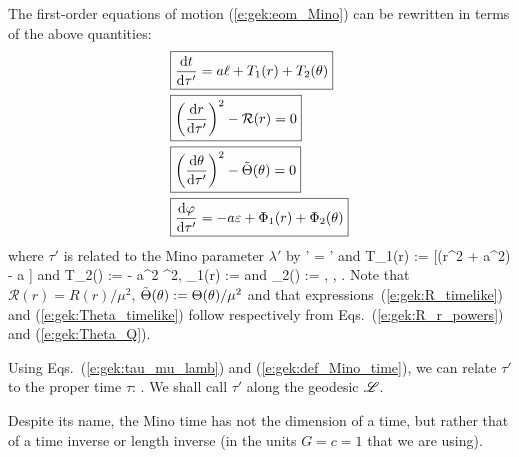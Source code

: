 The first-order equations of motion (\ref{e:gek:eom_Mino}) can be rewritten in terms of the above quantities:
\begin{subequations}
\label{e:gek:timelike_system}
\begin{align}
& \fbox{$\displaystyle  \frac{\mathrm{d} t}{\mathrm{d} \tau'} = a\ell + T_1(r) + T_2(\theta) $} \label{e:gek:dtdmino_timelike}\\
& \fbox{$\displaystyle   \left( \frac{\mathrm{d} r}{\mathrm{d} \tau'} \right)^2 - \mathcal{R}(r) = 0 $} \label{e:gek:r_eff_pot_timelike}\\
& \fbox{$\displaystyle  \left( \frac{\mathrm{d} \theta}{\mathrm{d} \tau'} \right)^2 - \tilde{\Theta}(\theta) = 0 $} \label{e:gek:th_eff_pot_timelike}\\
& \fbox{$\displaystyle  \frac{\mathrm{d} \varphi}{\mathrm{d} \tau'}  = - a \varepsilon + \Phi_1(r) + \Phi_2(\theta) $} \label{e:gek:dphdmino_timelike}
\end{align}
\end{subequations}
where $\tau'$ is related to the Mino parameter $\lambda'$ by
\be
   \tau' = \mu \lambda'
\ee
and
\be
    T_1(r) :=  [\veps (r^2 + a^2)  - a \ell]
    \qquad\mbox{and}\qquad
    T_2(\th) := - a^2 \veps \sin^2\th,
\ee
\be
    \Phi_1(r) := 
    \qquad\mbox{and}\qquad
    \Phi_2(\th) := \frac{\ell}{\sin^2\th} ,
\ee
\be \label{e:gek:R_timelike}
  ,
\ee
\be \label{e:gek:Theta_timelike}
   .
\ee
Note that $\mathcal{R}(r) = R(r) / \mu^2$, $\tilde\Theta(\theta) := \Theta(\theta) / \mu^2$
and that expressions~(\ref{e:gek:R_timelike}) and (\ref{e:gek:Theta_timelike})
follow respectively from Eqs.~(\ref{e:gek:R_r_powers}) and (\ref{e:gek:Theta_Q}).

Using Eqs.~(\ref{e:gek:tau_mu_lamb}) and (\ref{e:gek:def_Mino_time}), we can
relate $\tau'$ to the proper time $\tau$:
\be \label{e:gek:Mino_time_tau}
    .
\ee
We shall call $\tau'$ 
along the geodesic $\mathscr{L}$.
\begin{remark}
Despite its name, the Mino time has not the dimension of a time, but rather
that of a time inverse or length inverse (in the units $G=c=1$ that we
are using).
\end{remark}


